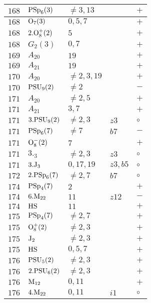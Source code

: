 \documentclass[a4paper, 11pt]{article}
\begin{document}
\begin{longtable}{lllll}
		$168$ & ${\rm PSp}_{6}(3)$ & $\neq 3,13$ &  & $+$ \\ \hline
		$168$ & ${\rm O}_{7}(3)$ & $0, 5, 7$ &  & $+$ \\ \hline
		$168$ & $2.{\rm O}_{8}^+(2)$ & $5$ &  & $+$ \\ \hline
		$168$ & $G_{2}(3)$ & $0,7$ &  & $+$ \\ \hline
		$169$ & $A_{20}$ & $19$ &  & $+$ \\ \hline
		$169$ & $A_{21}$ & $19$ &  & $+$ \\ \hline
		$170$ & $A_{20}$ & $\neq 2,3,19$ &  & $+$ \\ \hline
		$170$ & ${\rm PSU}_{9}(2)$ & $\neq 2$ &  & $-$ \\ \hline
		$171$ & $A_{20}$ & $\neq 2,5$ &  & $+$ \\ \hline
		$171$ & $A_{21}$ & $3,7$ &  & $+$ \\ \hline
		$171$ & $3.{\rm PSU}_{9}(2)$ & $\neq 2,3$ & $z3$ & $\circ$ \\ \hline
		$171$ & ${\rm PSp}_{6}(7)$ & $\neq 7$ & $b7$ & $-$ \\ \hline
		$171$ & ${\rm O}_{8}^-(2)$ & $7$ &  & $+$ \\ \hline
		$171$ & $3._{3}$ & $\neq 2,3$ & $z3$ & $\circ$ \\ \hline
		$171$ & $3.{\rm J}_3$ & $0,17,19$ & $z3, b5$ & $\circ$ \\ \hline
		$172$ & $2.{\rm PSp}_{6}(7)$ & $\neq 2,7$ & $b7$ & $\circ$ \\ \hline
		$174$ & ${\rm PSp}_{4}(7)$ & $2$ &  & $+$ \\ \hline
		$174$ & $6.{\rm M}_{22}$ & $11$ & $z12$ & $-$ \\ \hline
		$174$ & ${\rm HS}$ & $11$ &  & $+$ \\ \hline
		$175$ & ${\rm PSp}_{4}(7)$ & $\neq 2,7$ &  & $+$ \\ \hline
		$175$ & ${\rm O}_{8}^+(2)$ & $\neq 2,3$ &  & $+$ \\ \hline
		$175$ & ${\rm J}_2$ & $\neq 2,3$ &  & $+$ \\ \hline
		$175$ & ${\rm HS}$ & $0,5,7$ &  & $+$ \\ \hline
		$176$ & ${\rm PSU}_{5}(2)$ & $\neq 2,3$ &  & $+$ \\ \hline
		$176$ & $2.{\rm PSU}_{6}(2)$ & $\neq 2,3$ &  & $+$ \\ \hline
		$176$ & ${\rm M}_{12}$ & $0,11$ &  & $+$ \\ \hline
		$176$ & $4.{\rm M}_{22}$ & $0,11$ & $i1$ & $\circ$ \\ \hline

\end{longtable}
\end{document}
